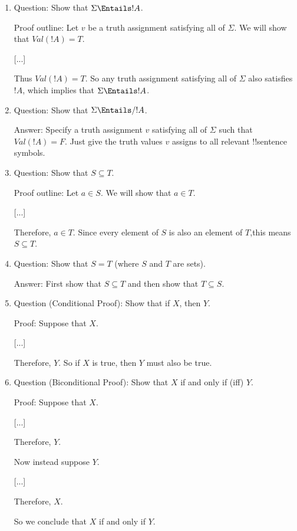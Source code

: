 \documentclass[../../../include/open-logic-section]{subfiles}
\begin{document}

\begin{enumerate}

\item Question: Show that $\Sigma \Entails !A$.

Proof outline: Let $v$ be a truth assignment satisfying all of $\Sigma$. We will show that $Val(!A) = T$.

    [...]

Thus $Val(!A) = T$. So any truth assignment satisfying all of $\Sigma$ also satisfies $!A$, which implies that $\Sigma \Entails !A$.

\item Question: Show that $\Sigma \Entails/ !A$.

Answer: Specify a truth assignment $v$ satisfying all of $\Sigma$ such that$Val(!A) = F$. Just give the truth values $v$ assigns to all relevant
!!{sentence} symbols.

\item Question: Show that $S \subseteq T$.

Proof outline: Let $a \in S$. We will show that $a \in T$.

[...]

Therefore, $a \in T$. Since every element of $S$ is also an element of $T$,this means $S \subseteq T$.

\item Question: Show that $S = T$ (where $S$ and $T$ are sets).

Answer: First show that $S \subseteq T$ and then show that $T \subseteq S$.
\item Question (Conditional Proof): Show that if $X$, then $Y$.

Proof: Suppose that $X$.

[...]

Therefore, $Y$. So if $X$ is true, then $Y$ must also be true.

\item Question (Biconditional Proof): Show that $X$ if and only if (iff)
$Y$.

Proof: Suppose that $X$.

[...]

Therefore, $Y$.

Now instead suppose $Y$.

[...]

Therefore, $X$.

So we conclude that $X$ if and only if $Y$.


\end{enumerate}
\end{document}
